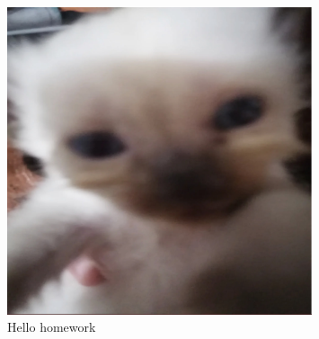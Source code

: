 \documentclass{article}
\begin{document}
\begin{figure}[ht]
\centering
\includegraphics[width=0.8\textwidth]{sample.jpg}
\caption{Hello homework}
\end{figure}
\end{document}
